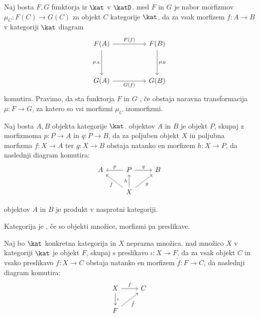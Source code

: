 
\begin{definicija}
  Naj bosta $F, G$ funktorja iz $\kat$ v $\katD$.
   med $F$ in $G$ je nabor morfizmov $\mu_C: F(C)
  \to G(C)$ za objekt $C$ kategorije $\kat$, da za vsak morfizem $f: A \to B$ v
  kategoriji $\kat$ diagram
  \[\begin{tikzcd}
	  {F(A)} && {F(B)} \\
	  \\
	  {G(A)} && {G(B)}
	  \arrow["{F(f)}", from=1-1, to=1-3]
	  \arrow["{\mu_A}"', from=1-1, to=3-1]
	  \arrow["{\mu_B}", from=1-3, to=3-3]
	  \arrow["{G(f)}"', from=3-1, to=3-3]
	\end{tikzcd}\]
  komutira.
  Pravimo, da sta funktorja $F$ in $G$ , če obstaja
  naravna transformacija $\mu: F \to G$, za katero so vsi morfizmi $\mu_C$
  izomorfizmi.
\end{definicija}



\begin{definicija}
  Naj bosta $A, B$ objekta kategorije $\kat$.
   objektov $A$ in $B$ je objekt $P$, skupaj z morfizmoma $p: P
  \to A$ in $q: P \to B$, da za poljuben objekt $X$ in poljubna morfizma $f: X
  \to A$ ter $g: X \to B$ obstaja natanko en morfizem $h: X \to P$, da naslednji
  diagram komutira:
  \[\begin{tikzcd}
	  A & P & B \\
	  & X
	  \arrow["p"', from=1-2, to=1-1]
	  \arrow["q", from=1-2, to=1-3]
	  \arrow["f", from=2-2, to=1-1]
	  \arrow["h", from=2-2, to=1-2]
	  \arrow["g"', from=2-2, to=1-3]
	\end{tikzcd}\]
\end{definicija}

\begin{definicija}
   objektov $A$ in $B$ je produkt v nasprotni kategoriji.
\end{definicija}


\begin{definicija}
  Kategorija je , če so objekti množice, morfizmi pa
  preslikave.
\end{definicija}

\begin{definicija}
  Naj bo $\kat$ konkretna kategorija in $X$ neprazna množica.
   nad množico $X$ v kategoriji $\kat$ je objekt $F$,
  skupaj s preslikavo $\iota: X \to F$, da za vsak objekt $C$ in vsako
  preslikavo $f: X \to C$ obstaja natanko en morfizem $\tilde{f}: F \to C$, da
  naslednji diagram komutira:
  \[\begin{tikzcd}
	  X & C \\
	  F
	  \arrow["f", from=1-1, to=1-2]
	  \arrow["\iota", from=1-1, to=2-1]
	  \arrow["{\tilde{f}}"', from=2-1, to=1-2]
	\end{tikzcd}\]
\end{definicija}

